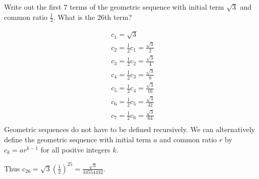 \begin{example}
    Write out the first \(7\) terms of the geometric sequence with initial term \(\sqrt{3}\) and common ratio \(\frac{1}{2}\). What is the \(26\)th term?
    \begin{solution}
        \begin{gather*}
            c_1 = \sqrt{3} \\
            c_2 = \frac{1}{2}c_1 = \frac{\sqrt{3}}{2} \\
            c_3 = \frac{1}{2}c_2 = \frac{\sqrt{3}}{4} \\
            c_4 = \frac{1}{2}c_3 = \frac{\sqrt{3}}{8} \\
            c_5 = \frac{1}{2}c_4 = \frac{\sqrt{3}}{16} \\
            c_6 = \frac{1}{2}c_5 = \frac{\sqrt{3}}{32} \\
            c_7 = \frac{1}{2}c_6 = \frac{\sqrt{3}}{64} \\
        \end{gather*}
        Geometric sequences do not have to be defined recursively. We can alternatively define the geometric sequence with initial term \(a\) and common ratio \(r\) by \(c_k = ar^{k-1}\) for all positve integers \(k.\)

        Thus \(c_{26} = \sqrt{3}\left(\frac{1}{2}\right)^{25} = \frac{\sqrt{3}}{33554432}.\)
    \end{solution}
\end{example}
